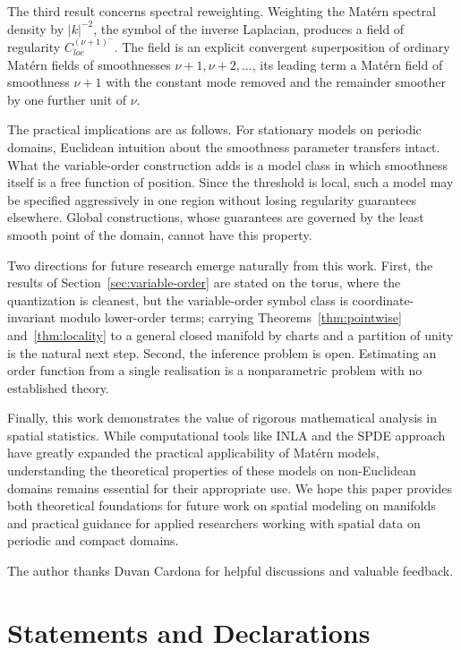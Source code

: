 \documentclass[pdflatex,sn-mathphys,Numbered]{sn-jnl}
\theoremstyle{thmstyleone}%
\theoremstyle{thmstyletwo}%
\theoremstyle{thmstylethree}%
\begin{document}
The third result concerns spectral reweighting. Weighting the Mat\'ern spectral
density by $|k|^{-2}$, the symbol of the inverse Laplacian, produces a field of
regularity $C^{(\nu+1)^-}_{loc}$. The field is an explicit convergent
superposition of ordinary Mat\'ern fields of smoothnesses $\nu+1,\nu+2,\dots$,
its leading term a Mat\'ern field of smoothness $\nu+1$ with the constant mode
removed and the remainder smoother by one further unit of $\nu$.

The practical implications are as follows. For stationary models on periodic
domains, Euclidean intuition about the smoothness parameter transfers intact. What the variable-order construction
adds is a model class in which smoothness itself is a free function of position. Since the threshold is local, such a model may be
specified aggressively in one region without losing regularity guarantees
elsewhere. Global constructions, whose guarantees are governed by the least
smooth point of the domain, cannot have this property.

Two directions for future research emerge naturally from this work. First, the
results of Section~\ref{sec:variable-order} are stated on the torus, where the
quantization is cleanest, but the variable-order symbol class is
coordinate-invariant modulo lower-order terms; carrying
Theorems~\ref{thm:pointwise} and~\ref{thm:locality} to a general closed manifold
by charts and a partition of unity is the natural next step. Second, the inference
problem is open. Estimating an order function from a single realisation is a
nonparametric problem with no established theory.

Finally, this work demonstrates the value of rigorous mathematical analysis in
spatial statistics. While computational tools like INLA and the SPDE approach
have greatly expanded the practical applicability of Mat\'ern models,
understanding the theoretical properties of these models on non-Euclidean
domains remains essential for their appropriate use. We hope this paper provides
both theoretical foundations for future work on spatial modeling on manifolds
and practical guidance for applied researchers working with spatial data on
periodic and compact domains.


\backmatter


The author thanks Duvan Cardona for helpful discussions and valuable feedback.

\section*{Statements and Declarations}
\end{document}
